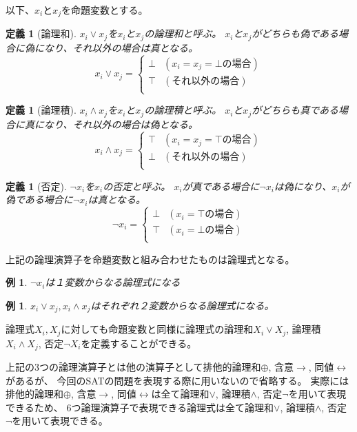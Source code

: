 \documentclass[titlepage]{jsarticle}
\newtheorem{definition}[thm]{定義}
\newtheorem{example}[thm]{例}
\begin{document}
以下、$x_i$と$x_j$を命題変数とする。

\begin{definition}[論理和]
	$x_i \lor x_j$を$x_i$と$x_j$の論理和と呼ぶ。
	$x_i$と$x_j$がどちらも偽である場合に偽になり、それ以外の場合は真となる。
	\[
		x_i \lor x_j = 
		\begin{cases}
			\bot & (x_i=x_j=\bot{の場合}) \\
			\top & ({それ以外の場合}) \\
		\end{cases}
	\]
\end{definition}

\begin{definition}[論理積]
	$x_i \land x_j$を$x_i$と$x_j$の論理積と呼ぶ。
	$x_i$と$x_j$がどちらも真である場合に真になり、それ以外の場合は偽となる。
	\[
		x_i \land x_j = 
		\begin{cases}
			\top & (x_i=x_j=\top{の場合}) \\
			\bot & ({それ以外の場合}) \\
		\end{cases}
	\]
\end{definition}

\begin{definition}[否定]
	$\neg x_i$を$x_i$の否定と呼ぶ。
	$x_i$が真である場合に$\neg x_i$は偽になり、$x_i$が偽である場合に$\neg x_i$は真となる。
	\[
		\neg x_i =
		\begin{cases}
			\bot & (x_i=\top{の場合}) \\
			\top & (x_i=\bot{の場合}) \\
		\end{cases}
	\]
\end{definition}

上記の論理演算子を命題変数と組み合わせたものは論理式となる。
\begin{example}
	$\neg x_i$は１変数からなる論理式になる
\end{example}
\begin{example}
	$x_i \lor x_j, x_i \land x_j$はそれぞれ２変数からなる論理式になる。
\end{example}

論理式$X_i, X_j$に対しても命題変数と同様に論理式の論理和$X_i \lor X_j$, 論理積$X_i \land X_j$, 否定$\neg X_i$を定義することができる。

上記の3つの論理演算子とは他の演算子として排他的論理和$\oplus$, 含意$\to$, 同値$\leftrightarrow$があるが、
今回のSATの問題を表現する際に用いないので省略する。
実際には排他的論理和$\oplus$, 含意$\to$, 同値$\leftrightarrow$は全て論理和$\lor$, 論理積$\land$, 否定$\neg$を用いて表現できるため、
6つ論理演算子で表現できる論理式は全て論理和$\lor$, 論理積$\land$, 否定$\neg$を用いて表現できる。
\end{document}
